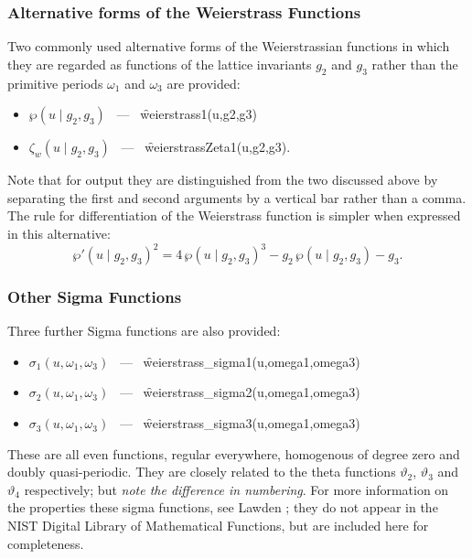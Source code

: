 \subsubsection{Alternative forms of the Weierstrass Functions}
\hypertarget{WEIERSTRASS1}{}
\hypertarget{WEIERSTRASSZETA1}{}
\hypertarget{operator:WEIERSTRASS1}{}
\hypertarget{operator:WEIERSTRASSZETA1}{}
 

Two commonly used alternative forms of the Weierstrassian functions in which
they are regarded as functions of the lattice invariants $g_2$ and $g_3$
rather than the primitive periods $\omega_1$ and $\omega_3$ are provided:
\begin{itemize}
\item  $\wp(u \mid g_2, g_3)$ \ --- \ \f{weierstrass1(u,g2,g3)}
\item $\zeta_w(u \mid g_2, g_3)$ \ --- \ \f{weierstrassZeta1(u,g2,g3)}.
\end{itemize}
Note that for output they are distinguished from the two discussed above
by separating the first and
second arguments by a vertical bar rather than a comma. The rule for
differentiation of the Weierstrass function is simpler when expressed in
this  alternative:
\[ \wp'(u \mid g_2,g_3)^2 = 4\,\wp(u \mid g_2,g_3)^3
   - g_2\, \wp(u \mid g_2,g_3) -g_3. \]

\subsubsection{Other Sigma Functions}
\hypertarget{SIGMA1}{}
\hypertarget{operator:WEIERSTRASS_SIGMA1}{}
\hypertarget{operator:WEIERSTRASS_SIGMA2}{}
\hypertarget{operator:WEIERSTRASS_SIGMA3}{}

Three further Sigma functions are also provided:
\begin{itemize}
\item $\sigma_1(u, \omega_1, \omega_3)$ \ --- \ \f{weierstrass\_sigma1(u,omega1,omega3)}
\item $\sigma_2(u, \omega_1, \omega_3)$ \ --- \ \f{weierstrass\_sigma2(u,omega1,omega3)}
\item $\sigma_3(u, \omega_1, \omega_3)$ \ --- \ \f{weierstrass\_sigma3(u,omega1,omega3)}
\end{itemize}
These are all even functions, regular everywhere, homogenous of degree zero and doubly quasi-periodic. They are closely related to the
theta functions $\vartheta_2$, $\vartheta_3$ and $\vartheta_4$ respectively; but \emph{note the difference in numbering}.
For more information on the properties these sigma functions, see Lawden \cite{Lawden:89};
they do not appear in the NIST Digital Library of Mathematical Functions, but are included here for completeness.

